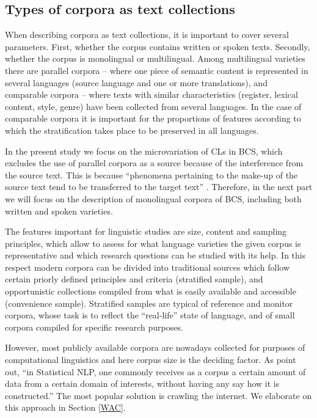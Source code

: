 \subsection{Types of corpora as text collections}

When describing corpora as text collections, it is important to cover several parameters. First, whether the corpus contains written or spoken texts. Secondly, whether the corpus is monolingual or multilingual. Among multilingual varieties there are parallel corpora – where one piece of semantic content is represented in several languages (source language and one or more translations), and comparable corpora – where texts with similar characteristics (register, lexical content, style, genre) have been collected from several languages. In the case of comparable corpora it is important for the proportions of features according to which the stratification takes place to be preserved in all languages.

In the present study we focus on the microvariation of CLs in BCS, which excludes the use of parallel corpora as a source because of the interference from the source text. This is because “phenomena pertaining to the make-up of the source text tend to be transferred to the target text” \citep[275]{Toury95}. Therefore, in the next part we will focus on the description of monolingual corpora of BCS, including both written and spoken varieties.

The features important for linguistic studies are size, content and sampling principles, which allow to assess for what language varieties the given corpus is representative and which research questions can be studied with its help. In this respect modern corpora can be divided into traditional sources which follow certain priorly defined principles and criteria (stratified sample), and opportunistic collections compiled from what is easily available and accessible (convenience sample). Stratified samples are typical of reference and monitor corpora, whose task is to reflect the “real-life” state of language, and of small corpora compiled for specific research purposes.

However, most publicly available corpora are nowadays collected for purposes of computational linguistics and here corpus size is the deciding factor. As \citet[120]{ManningSchutze99} point out, “in Statistical NLP, one commonly receives as a corpus a certain amount of data from a certain domain of interests, without having any say how it is constructed.” The most popular solution is crawling the internet. We elaborate on this approach in Section \ref{WAC}.

